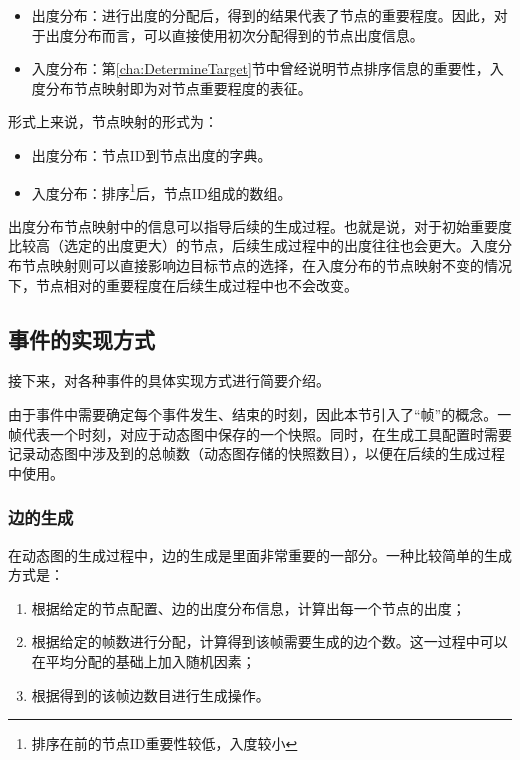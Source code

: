 \begin{itemize}
  \item 出度分布：进行出度的分配后，得到的结果代表了节点的重要程度。因此，对于出度分布而言，可以直接使用初次分配得到的节点出度信息。
  \item 入度分布：第\ref{cha:DetermineTarget}节中曾经说明节点排序信息的重要性，入度分布节点映射即为对节点重要程度的表征。
\end{itemize}

\vspace{0.2cm}

形式上来说，节点映射的形式为：

\begin{itemize}
  \item 出度分布：节点ID到节点出度的字典。
  \item 入度分布：排序\footnote{排序在前的节点ID重要性较低，入度较小}后，节点ID组成的数组。
\end{itemize}

\vspace{0.2cm}

出度分布节点映射中的信息可以指导后续的生成过程。也就是说，对于初始重要度比较高（选定的出度更大）的节点，后续生成过程中的出度往往也会更大。入度分布节点映射则可以直接影响边目标节点的选择，在入度分布的节点映射不变的情况下，节点相对的重要程度在后续生成过程中也不会改变。

\subsection{事件的实现方式}

接下来，对各种事件的具体实现方式进行简要介绍。

由于事件中需要确定每个事件发生、结束的时刻，因此本节引入了“帧”的概念。一帧代表一个时刻，对应于动态图中保存的一个快照。同时，在生成工具配置时需要记录动态图中涉及到的总帧数（动态图存储的快照数目），以便在后续的生成过程中使用。

\subsubsection{边的生成}

在动态图的生成过程中，边的生成是里面非常重要的一部分。一种比较简单的生成方式是：

\begin{enumerate}
  \item 根据给定的节点配置、边的出度分布信息，计算出每一个节点的出度；
  \item 根据给定的帧数进行分配，计算得到该帧需要生成的边个数。这一过程中可以在平均分配的基础上加入随机因素；
  \item 根据得到的该帧边数目进行生成操作。
\end{enumerate}

